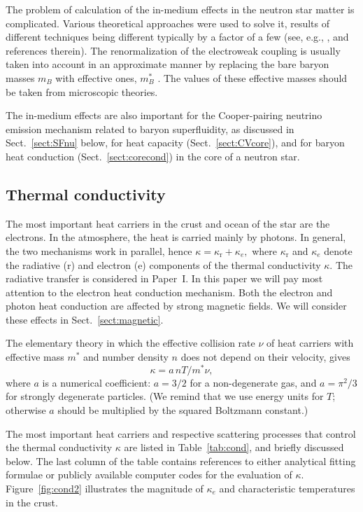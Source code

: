 \documentclass[smallextended]{svjour3}       %
\newcommand{\beq}{\begin{equation}}
\newcommand{\eeq}{\end{equation}}
\newcounter{count}
\begin{document}
The problem of calculation of the in-medium effects in the
neutron star matter is complicated. Various theoretical
approaches were used to solve it, results of different
techniques being different typically by a factor of a few
(see, e.g., \citealp{Blaschke-ea95}, and references
therein). The renormalization of the electroweak coupling is
usually taken into account in an approximate manner by
replacing the bare baryon masses $m_B$ with effective ones,
$m_B^*$ \citep[e.g.,][]{YKGH01}. The values of these
effective masses should be taken from microscopic theories.

The in-medium effects are also important for the
Cooper-pairing neutrino emission mechanism related to baryon
superfluidity, as discussed in Sect.~\ref{sect:SFnu} below,
for heat capacity (Sect.~\ref{sect:CVcore}), and for baryon
heat conduction (Sect.~\ref{sect:corecond}) in the core of a
neutron star.

\subsection{Thermal conductivity}
\label{sect:conductivity}

The most important heat carriers in the crust and ocean of
the star  are the electrons. In the atmosphere, the heat is
carried mainly by photons. In general, the two mechanisms
work in parallel, hence
$
   \kappa=\kappa_\mathrm{r}+\kappa_e,
$
where $\kappa_\mathrm{r}$ and $\kappa_e$  denote
the radiative (r) and electron (e) components of the thermal
conductivity $\kappa$. The radiative transfer is considered
in Paper~I. In this paper we will pay most attention to the
electron heat conduction mechanism. Both the electron and
photon heat conduction are affected by strong
magnetic fields. We will consider these effects in
Sect.~\ref{sect:magnetic}.

The elementary theory in which  the effective collision rate
$\nu$ of heat carriers with effective mass $m^*$ and number
density $n$ does not depend on their velocity, gives
\citep{Ziman}
\beq
 \kappa = a \,{n T}/{m^\ast\nu},
\label{elementary}
\eeq
where $a$ is a numerical coefficient: $a=3/2$ for a
non-degenerate gas, and $a=\pi^2/3$ for strongly degenerate
particles. (We remind that we use energy units for $T$;
otherwise $a$ should be multiplied by the squared
Boltzmann constant.)

The most important heat carriers and respective scattering
processes that control the thermal conductivity $\kappa$ are
listed in Table~\ref{tab:cond}, and briefly discussed below. The last column of
the table contains references to either analytical fitting
formulae or publicly available computer codes for the evaluation
of $\kappa$.
Figure~\ref{fig:cond2} illustrates the magnitude of
$\kappa_e$ and characteristic
temperatures in the crust.
\end{document}
